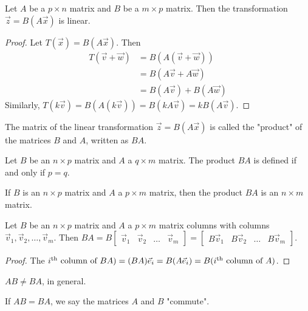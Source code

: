 \documentclass[a4paper,11pt]{article}
\begin{document}
\begin{outline}
    
    Let \(A\) be a \(p \times n\) matrix and \(B\) be a \(m \times p\) matrix. Then the transformation
    \(\vec{z} = B(A\vec{x})\) is linear.
    
    \begin{proof}
      Let \(T(\vec{x}) = B(A\vec{x})\). Then
      \begin{align*}
        T(\vec{v}+\vec{w}) &= B(A(\vec{v}+\vec{w}))     \\
                           &= B(A\vec{v}+A\vec{w})      \\
                           &= B(A\vec{v}) + B(A\vec{w})
      \end{align*}
      Similarly, \(T(k\vec{v}) = B(A(k\vec{v})) = B(kA\vec{v}) = kB(A\vec{v})\).
    \end{proof}
    
    The matrix of the linear transformation \(\vec{z} = B(A\vec{x})\) is called the "product" of the matrices \(B\)
    and \(A\), written as \(BA\).
    
    Let \(B\) be an \(n \times p\) matrix and \(A\) a \(q \times m\) matrix. The product \(BA\) is defined
    if and only if \(p = q\).
    
    If \(B\) is an \(n \times p\) matrix and \(A\) a \(p \times m\) matrix, then the product \(BA\) is
    an \(n \times m\) matrix.
    
    Let \(B\) be an \(n \times p\) matrix and \(A\) a \(p \times m\) matrix columns with columns
    \(\vec{v}_1, \vec{v}_2, \ldots, \vec{v}_m\). Then \(BA = B\begin{bmatrix} \vec{v}_1 & \vec{v}_2 & \ldots
    & \vec{v}_m\end{bmatrix} = \begin{bmatrix} B\vec{v}_1 & B\vec{v}_2 & \ldots & B\vec{v}_m\end{bmatrix}\).
    
    \begin{proof}
      The \(i\textsuperscript{th} \text{ column of } BA) = (BA)\vec{e}_i = B(A\vec{e}_i) = B(i\textsuperscript{th}
      \text{ column of } A)\).
    \end{proof}
    
    \(AB \neq BA\), in general.
    
    If \(AB = BA\), we say the matrices \(A\) and \(B\) "commute".
    

\end{outline}
\end{document}
